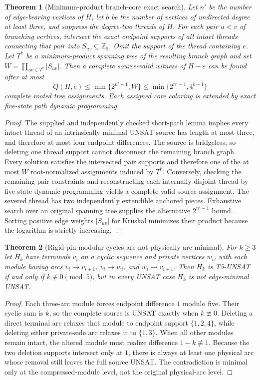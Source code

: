 \documentclass[11pt]{article}
\newtheorem{theorem}{Theorem}
\begin{document}
\begin{theorem}[Minimum-product branch-core exact search]
Let $n'$ be the number of edge-bearing vertices of $H$, let $b$ be the
number of vertices of undirected degree at least three, and suppress
the degree-two threads of $H$. For each pair $u<v$ of branching
vertices, intersect the exact endpoint supports of all intact
threads connecting that pair into $S_{uv}\subseteq\mathbb Z_5$.
Omit the support of the thread containing $e$. Let $T^*$ be a
minimum-product spanning tree of the resulting branch graph and set
$W=\prod_{uv\in T^*}|S_{uv}|$. Then a complete source-valid witness
of $H-e$ can be found after at most
\[
Q(H,e)\leq \min\{2^{n'-1},W\}\leq
\min\{2^{n'-1},4^{b-1}\}
\]
complete rooted tree assignments. Each assigned core coloring is
extended by exact five-state path dynamic programming.
\end{theorem}
\begin{proof}
The supplied and independently checked short-path lemma implies
every intact thread of an intrinsically minimal UNSAT source has
length at most three, and therefore at most four endpoint differences.
The source is bridgeless, so deleting one thread support cannot
disconnect the remaining branch graph. Every solution satisfies the
intersected pair supports and therefore one of the at most $W$
root-normalized assignments induced by $T^*$. Conversely, checking
the remaining pair constraints and reconstructing each internally
disjoint thread by five-state dynamic programming yields a complete
valid source assignment. The severed thread has two independently
extendible anchored pieces. Exhaustive search over an original
spanning tree supplies the alternative $2^{n'-1}$ bound.
Sorting positive edge weights $|S_{uv}|$ for Kruskal minimizes their
product because the logarithm is strictly increasing.
\end{proof}

\begin{theorem}[Rigid-pin modular cycles are not physically arc-minimal]
For $k\geq3$ let $H_k$ have terminals $v_i$ on a cyclic sequence and
private vertices $w_i$, with each module having arcs
$v_i\to v_{i+1}$, $v_i\to w_i$, and $w_i\to v_{i+1}$.
Then $H_k$ is T5-UNSAT if and only if $k\not\equiv0\pmod5$, but in every
UNSAT case $H_k$ is not edge-minimal UNSAT.
\end{theorem}
\begin{proof}
Each three-arc module forces endpoint difference $1$ modulo five.
Their cyclic sum is $k$, so the complete source is UNSAT exactly when
$k\not\equiv0$. Deleting a direct terminal arc relaxes that module
to endpoint support $\{1,2,4\}$, while deleting either private-side
arc relaxes it to $\{1,3\}$. When all other modules remain intact, the
altered module must realize difference $1-k\not\equiv1$. Because the
two deletion supports intersect only at $1$, there is always at least
one physical arc whose removal still leaves the full source UNSAT.
The contradiction is minimal only at the compressed-module level,
not the original physical-arc level.
\end{proof}
\end{document}
